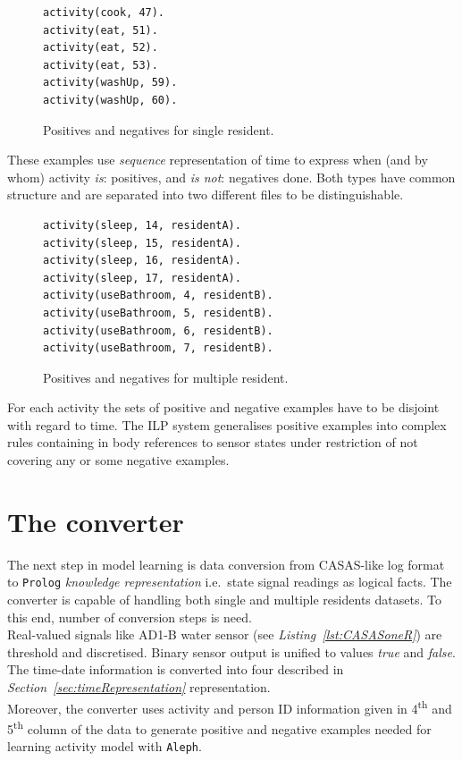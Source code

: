 \documentclass[12pt, a4paper, pdflatex, leqno, twoside, openright]{report}
\newcommand{\ts}{\textsuperscript}
\begin{document}
\begin{figure}[htb] %
  \begin{verbatim}
activity(cook, 47).
activity(eat, 51).
activity(eat, 52).
activity(eat, 53).
activity(washUp, 59).
activity(washUp, 60).
  \end{verbatim}
  \caption{Positives and negatives for single resident.\label{lst:singleposneg}}
\end{figure}

These examples use \emph{sequence} representation of time to express when (and by whom) activity \emph{is}: positives, and \emph{is not}: negatives done. Both types have common structure and are separated into two different files to be distinguishable.\\

\begin{figure}[htb] %
  \begin{verbatim}
activity(sleep, 14, residentA).
activity(sleep, 15, residentA).
activity(sleep, 16, residentA).
activity(sleep, 17, residentA).
activity(useBathroom, 4, residentB).
activity(useBathroom, 5, residentB).
activity(useBathroom, 6, residentB).
activity(useBathroom, 7, residentB).
  \end{verbatim}
  \caption{Positives and negatives for multiple resident.\label{lst:multiposneg}}
\end{figure}

For each activity the sets of positive and negative examples have to be disjoint with regard to time. The ILP system generalises positive examples into complex rules containing in body references to sensor states under restriction of not covering any or some negative examples.

  \section{The converter}
The next step in model learning is data conversion from CASAS-like log format to \texttt{Prolog} \emph{knowledge representation} i.e.\ state signal readings as logical facts. The converter is capable of handling both single and multiple residents datasets. To this end, number of conversion steps is need.\\

Real-valued signals like AD1-B water sensor (see \emph{Listing~\ref{lst:CASASoneR}}) are threshold and discretised. Binary sensor output is unified to values \emph{true} and \emph{false}. The time-date information is converted into four described in \emph{Section~\ref{sec:timeRepresentation}} representation.\\
Moreover, the converter uses activity and person ID information given in 4\ts{th} and 5\ts{th} column of the data to generate positive and negative examples needed for learning activity model with \texttt{Aleph}.
\end{document}
